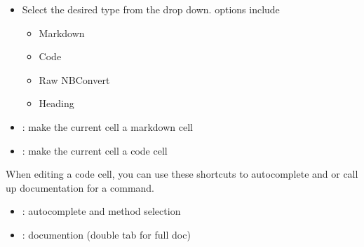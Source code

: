 \documentclass[letterpaper,10pt,english]{jupyterBook}
\begin{document}
\sphinxAtStartPar
{}
\begin{itemize}
\item {} 
\sphinxAtStartPar
Select the desired type from the drop down.  options include
\begin{itemize}
\item {} 
\sphinxAtStartPar
Markdown

\item {} 
\sphinxAtStartPar
Code

\item {} 
\sphinxAtStartPar
Raw NBConvert

\item {} 
\sphinxAtStartPar
Heading

\end{itemize}

\end{itemize}

\sphinxAtStartPar
{}
\begin{itemize}
\item {} 
\sphinxAtStartPar
{}: make the current cell a markdown cell

\item {} 
\sphinxAtStartPar
{}: make the current cell a code  cell

\end{itemize}

\sphinxAtStartPar
{}

\sphinxAtStartPar
When editing a code cell, you can use these short\sphinxhyphen{}cuts to autocomplete and or call up documentation for a command.
\begin{itemize}
\item {} 
\sphinxAtStartPar
{}: autocomplete and  method selection

\item {} 
\sphinxAtStartPar
{}: documention (double tab for full doc)

\end{itemize}
\end{document}
